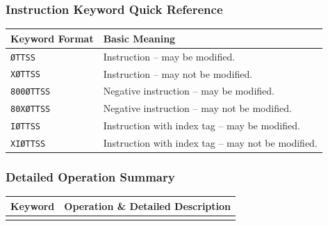 \documentclass{article}
\begin{document}
\begin{enumerate}
\vspace{1.5em}

\subsubsection*{Instruction Keyword Quick Reference}

\noindent
\begin{tabular}{ll}
\toprule
\textbf{Keyword Format} & \textbf{Basic Meaning} \\
\midrule
\texttt{ØTTSS}    & Instruction -- may be modified. \\
\texttt{XØTTSS}   & Instruction -- may not be modified. \\
\texttt{800ØTTSS} & Negative instruction -- may be modified. \\
\texttt{80XØTTSS} & Negative instruction -- may not be modified. \\
\texttt{IØTTSS}    & Instruction with index tag -- may be modified. \\
\texttt{XIØTTSS}   & Instruction with index tag -- may not be modified. \\
\bottomrule
\end{tabular}

\subsubsection*{Detailed Operation Summary}
\vspace{-1.2em} %
\begin{longtable}{l p{11.5cm}}
\toprule
\textbf{Keyword} & \textbf{Operation \& Detailed Description} \\
\midrule
\endhead
\bottomrule
\endfoot


\end{longtable}
\end{enumerate}
\end{document}
